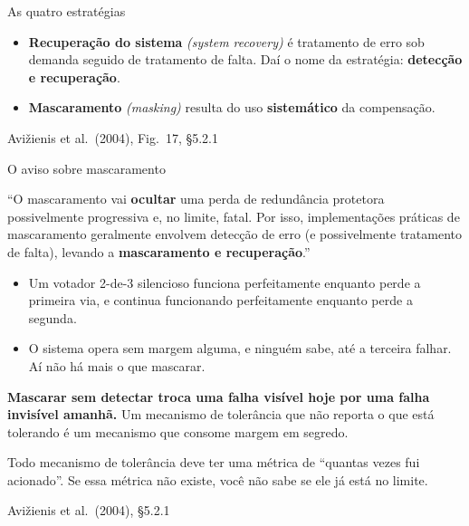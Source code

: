 \documentclass{beamer}
\newcommand{\en}[1]{{\color{depCinza}\textit{#1}}}
\newcommand{\sect}[1]{\par\smallskip\hfill{\tiny\color{black!55}Avi\v{z}ienis et al.\ (2004), #1}}
\begin{document}
\begin{frame}{As quatro estrat\'egias}
    \centering
    \diagEstrategias
    \vspace{0.1em}
    \scriptsize
    \begin{itemize}
        \item \textbf{Recupera\c{c}\~ao do sistema} \en{(system recovery)} \'e tratamento de erro sob demanda seguido de tratamento de falta. Da\'i o nome da estrat\'egia: \textbf{detec\c{c}\~ao e recupera\c{c}\~ao}.
        \item \textbf{Mascaramento} \en{(masking)} resulta do uso \textbf{sistem\'atico} da compensa\c{c}\~ao.
    \end{itemize}
    \sect{Fig.\ 17, \S5.2.1}
\end{frame}

\begin{frame}{O aviso sobre mascaramento}
    \footnotesize
    \begin{armadilha}
        \scriptsize
        ``O mascaramento vai \textbf{ocultar} uma perda de redund\^ancia protetora possivelmente progressiva e, no limite, fatal. Por isso, implementa\c{c}\~oes pr\'aticas de mascaramento geralmente envolvem detec\c{c}\~ao de erro (e possivelmente tratamento de falta), levando a \textbf{mascaramento e recupera\c{c}\~ao}.''
    \end{armadilha}
    \medskip
    \begin{itemize}
        \item Um votador 2-de-3 silencioso funciona perfeitamente enquanto perde a primeira via, e continua funcionando perfeitamente enquanto perde a segunda.
        \item O sistema opera sem margem alguma, e ningu\'em sabe, at\'e a terceira falhar. A\'i n\~ao h\'a mais o que mascarar.
    \end{itemize}
    \medskip
    \begin{ancora}
        \footnotesize
        \textbf{Mascarar sem detectar troca uma falha vis\'ivel hoje por uma falha invis\'ivel amanh\~a.} Um mecanismo de toler\^ancia que n\~ao reporta o que est\'a tolerando \'e um mecanismo que consome margem em segredo.
    \end{ancora}
    \medskip
    \begin{pratica}
        \scriptsize
        Todo mecanismo de toler\^ancia deve ter uma m\'etrica de ``quantas vezes fui acionado''. Se essa m\'etrica n\~ao existe, voc\^e n\~ao sabe se ele j\'a est\'a no limite.
    \end{pratica}
    \sect{\S5.2.1}
\end{frame}
\end{document}

